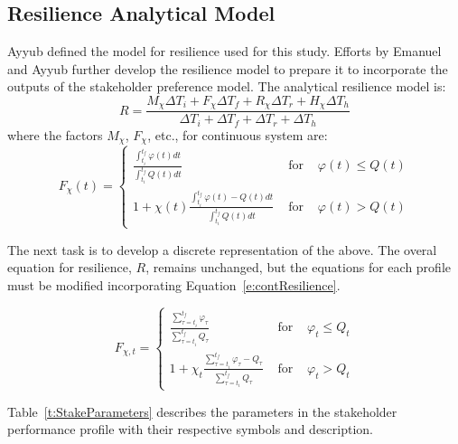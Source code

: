 \subsection{Resilience Analytical Model}


Ayyub \cite{Ayyub2014a} defined the model for resilience used for
this study. Efforts by Emanuel and Ayyub
\cite{Emanuel2017,Emanuel2018} further develop the resilience model
to prepare it to incorporate the outputs of the stakeholder preference
model. The analytical resilience model is:
\begin{equation}
  \label{e:contResilience}
    R = \frac{M_{\chi} \Delta T_i + F_{\chi} \Delta T_f + R_{\chi}
    \Delta T_r + H_{\chi} \Delta T_h}
  {\Delta T_i + \Delta T_f + \Delta T_r + \Delta T_h}
\end{equation}
where the factors $M_{\chi}$, $F_{\chi}$, etc., for continuous system are:
\begin{equation}
  \label{e:RPC}
  F_{\chi}(t) = \left\{\begin{array}{rcl}
      \frac{\displaystyle\int_{t_i}^{t_f}\varphi(t)dt}{\displaystyle\int_{t_i}^{t_f}Q(t)dt}
      & \text{ for } & \varphi(t) \leq Q(t) \\
      1 + \chi(t)
      \frac{\displaystyle\int_{t_i}^{t_f}\varphi(t)-Q(t)dt}{\displaystyle\int_{t_i}^{t_f}Q(t)dt}
      & \text{ for } & \varphi(t) > Q(t)
      \end{array}\right.
\end{equation}

The next task is to develop a discrete representation of the
above. The overal equation for resilience, $R$, remains unchanged, but
the equations for each profile must be modified incorporating
Equation~\ref{e:contResilience}.

\begin{equation}
  \label{e:RPD}
  F_{\chi,t} = \left\{\begin{array}{rcl}
    \frac{\displaystyle\sum_{\tau=t_{i}}^{t_f}\varphi_{\tau}}{\displaystyle\sum_{\tau=t_i}^{t_f}Q_{\tau}}
    & \text{ for } &
    \varphi_{t} \leq Q_t \\
      1 + \chi_t
      \frac{\displaystyle\sum_{\tau = t_i}^{t_f}\varphi_{\tau}-Q_{\tau}}{\displaystyle\sum_{\tau = t_i}^{t_f}Q_{\tau}}
      & \text{ for } &
      \varphi_{t} > Q_{t}
  \end{array}\right.
\end{equation}




Table~\ref{t:StakeParameters} describes the parameters in the
stakeholder performance profile with their respective symbols and
description.

